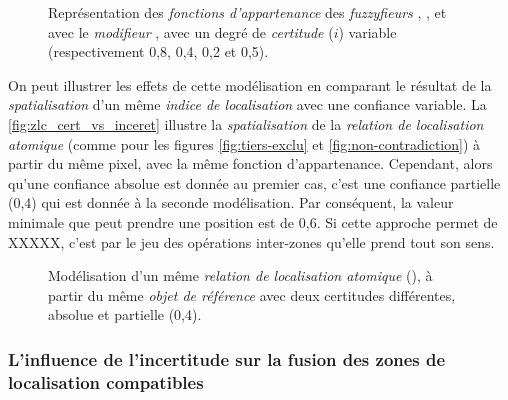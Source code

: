\begin{figure}
  \centering  \subfloat[\label{fig:fnc_app_inc}]{}\hfill
  \subfloat[\label{fig:fnc_app_inc_2}]{}

  \subfloat[\label{fig:fnc_app_inc_3}]{}\hfill
  \subfloat[\label{fig:fnc_app_inc_4}]{}
  \caption[Représentation des \emph{fonctions d'appartenance} de
  différents \emph{fuzzyfieurs} avec une
  \emph{incertitude}]{Représentation des \emph{fonctions
      d'appartenance} des \emph{fuzzyfieurs}
    \protect{} \protect{},
    \protect{} \protect{},
    \protect{} \protect{}
    et \protect{} avec le \emph{modifieur}
    \protect{} \protect{}, avec
    un degré de \emph{certitude} (\(i\)) variable (respectivement
    0,8, 0,4, 0,2 et 0,5).}
  \label{fig:fnc_incert}
\end{figure}

On peut illustrer les effets de cette modélisation en comparant le
résultat de la \emph{spatialisation} d'un même \emph{indice de
  localisation} avec une confiance variable. La
\autoref{fig:zlc_cert_vs_inceret} illustre la \emph{spatialisation} de
la \emph{relation de localisation atomique} 
(comme pour les figures \ref{fig:tiers-exclu} et
\ref{fig:non-contradiction}) à partir du même pixel, avec la même
fonction d'appartenance. Cependant, alors qu'une confiance absolue est
donnée au premier cas, c'est une confiance partielle (0,4) qui est
donnée à la seconde modélisation. Par conséquent, la valeur minimale
que peut prendre une position est de 0,6. Si cette approche permet de
XXXXX, c'est par le jeu des opérations inter-zones qu'elle prend tout
son sens.

\begin{figure}
  \centering
  \subfloat[]{}\hspace{2cm}
  \subfloat[]{}
  \caption{Modélisation d'un même \emph{relation de localisation
      atomique} (\protect{}), à partir du même
    \emph{objet de référence} avec deux certitudes différentes,
    absolue et partielle (0,4).}
  \label{fig:zlc_cert_vs_inceret}
\end{figure}


\subsubsection{L'influence de l'incertitude sur la fusion des zones de
  localisation compatibles}

